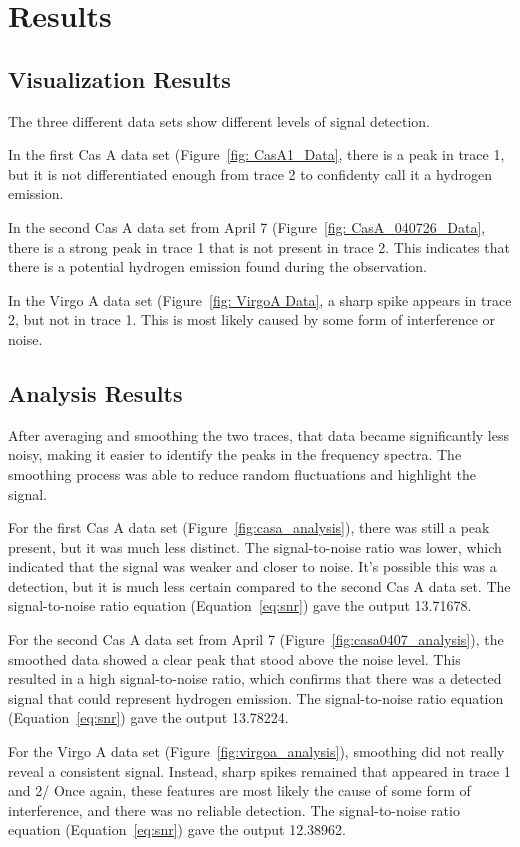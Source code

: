 \section{Results}

\subsection{Visualization Results}

The three different data sets show different levels of signal detection.


In the first Cas A data set (Figure~\ref{fig: CasA1_Data}, there is a peak in trace 1, but it is not differentiated enough from trace 2 to confidenty call it a hydrogen emission.


In the second Cas A data set from April 7 (Figure~\ref{fig: CasA_040726_Data}, there is a strong peak in trace 1 that is not present in trace 2. This indicates that there is a potential hydrogen emission found during the observation.


In the Virgo A data set (Figure~\ref{fig: VirgoA Data}, a sharp spike appears in trace 2, but not in trace 1. This is most likely caused by some form of interference or noise. 


\subsection{Analysis Results}

After averaging and smoothing the two traces, that data became significantly less noisy, making it easier to identify the peaks in the frequency spectra.
The smoothing process was able to reduce random fluctuations and highlight the signal.


For the first Cas A data set (Figure~\ref{fig:casa_analysis}), there was still a peak present, but it was much less distinct. The signal-to-noise ratio was lower, which indicated that the signal was weaker and closer to noise.
It's possible this was a detection, but it is much less certain compared to the second Cas A data set.
The signal-to-noise ratio equation (Equation~\ref{eq:snr}) gave the output 13.71678.


For the second Cas A data set from April 7 (Figure~\ref{fig:casa0407_analysis}), the smoothed data showed a clear peak that stood above the noise level. This resulted in a high signal-to-noise ratio, which confirms that there was a detected signal that could represent hydrogen emission.
The signal-to-noise ratio equation (Equation~\ref{eq:snr}) gave the output 13.78224.


For the Virgo A data set (Figure~\ref{fig:virgoa_analysis}), smoothing did not really reveal a consistent signal. Instead, sharp spikes remained that appeared in trace 1 and 2/
Once again, these features are most likely the cause of some form of interference, and there was no reliable detection. 
The signal-to-noise ratio equation (Equation~\ref{eq:snr}) gave the output 12.38962.
